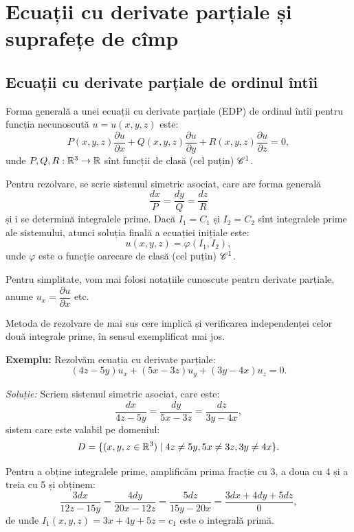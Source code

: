 
\chapter{Ecuații cu derivate parțiale și suprafețe de cîmp}

\section{Ecuații cu derivate parțiale de ordinul întîi}
\indent\indent Forma generală a unei ecuații cu derivate parțiale (EDP) de ordinul
întîi pentru funcția necunoscută $ u = u(x, y, z) $ este:
\[
  P(x, y, z) \dfrac{\partial u}{\partial x} + Q(x, y, z) \dfrac{\partial u}{\partial y} + %
  R(x, y, z) \dfrac{\partial u}{\partial z} = 0,
\]
unde $ P, Q, R : \mathbb{R}^3 \to \mathbb{R} $ sînt funcții de clasă (cel puțin) $\mathscr{C}^1$.

Pentru rezolvare, se scrie sistemul simetric asociat, care are forma generală
\[
  \dfrac{dx}{P} = \dfrac{dy}{Q} = \dfrac{dz}{R}
\]
și i se determină integralele prime. Dacă $ I_1 = C_1 $ și $ I_2 = C_2 $ sînt
integralele prime ale sistemului, atunci soluția finală a ecuației inițiale
este:
\[
  u(x, y, z) = \varphi(I_1, I_2),
\]
unde $ \varphi $ este o funcție oarecare de clasă (cel puțin) $\mathscr{C}^1$.

\begin{remark}\label{rk:not-dp}
  Pentru simplitate, vom mai folosi notațiile cunoscute pentru derivate parțiale,
  anume $ u_x = \dfrac{\partial u}{\partial x} $ etc.
\end{remark}

\begin{remark}\label{rk:int-indep}
  Metoda de rezolvare de mai sus cere implică și verificarea independenței celor
  două integrale prime, în sensul exemplificat mai jos.
\end{remark}

\textbf{Exemplu:} Rezolvăm ecuația cu derivate parțiale:
\[
  (4z - 5y)u_x + (5x - 3z)u_y + (3y - 4x)u_z = 0.
\]

\emph{Soluție:} Scriem sistemul simetric asociat, care este:
\[
  \dfrac{dx}{4z - 5y} = \dfrac{dy}{5x - 3z} = \dfrac{dz}{3y - 4x},
\]
sistem care este valabil pe domeniul:
\[
  D = \{(x, y, z \in \mathbb{R}^3) \mid 4z \neq 5y, 5x \neq 3z, 3y \neq 4x \}.
\]

Pentru a obține integralele prime, amplificăm prima fracție cu 3, a doua cu 4 și
a treia cu 5 și obținem:
\[
  \dfrac{3dx}{12z - 15y} = \dfrac{4dy}{20x - 12z} = \dfrac{5dz}{15y - 20x} = %
  \dfrac{3dx + 4dy + 5dz}{0},
\]
de unde $ I_1(x, y, z) = 3x + 4y + 5z = c_1 $ este o integrală primă.

